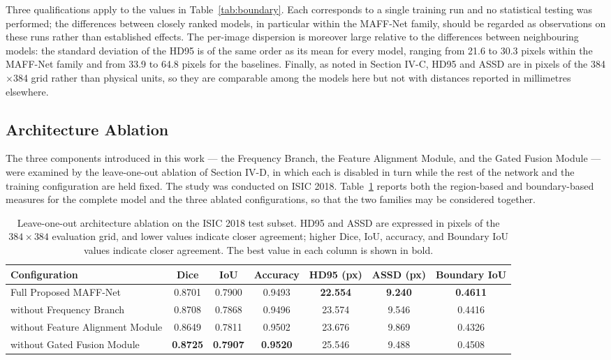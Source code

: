 Three qualifications apply to the values in Table~\ref{tab:boundary}. Each corresponds to a single training run and no statistical testing was performed; the differences between closely ranked models, in particular within the MAFF-Net family, should be regarded as observations on these runs rather than established effects. The per-image dispersion is moreover large relative to the differences between neighbouring models: the standard deviation of the HD95 is of the same order as its mean for every model, ranging from 21.6 to 30.3 pixels within the MAFF-Net family and from 33.9 to 64.8 pixels for the baselines. Finally, as noted in Section IV-C, HD95 and ASSD are in pixels of the 384$\times$384 grid rather than physical units, so they are comparable among the models here but not with distances reported in millimetres elsewhere.

\subsection{Architecture Ablation}

The three components introduced in this work --- the Frequency Branch, the Feature Alignment Module, and the Gated Fusion Module --- were examined by the leave-one-out ablation of Section IV-D, in which each is disabled in turn while the rest of the network and the training configuration are held fixed. The study was conducted on ISIC 2018. Table~\ref{tab:ablation} reports both the region-based and boundary-based measures for the complete model and the three ablated configurations, so that the two families may be considered together.

\begin{table}[!t]
\centering
\caption{Leave-one-out architecture ablation on the ISIC 2018 test subset. HD95
and ASSD are expressed in pixels of the $384\times384$ evaluation grid, and lower
values indicate closer agreement; higher Dice, IoU, accuracy, and Boundary IoU
values indicate closer agreement. The best value in each column is shown in
bold.}
\label{tab:ablation}
\setlength{\tabcolsep}{6pt}
\small
\begin{tabular}{lcccccc}
\toprule
Configuration & Dice & IoU & Accuracy & HD95 (px) & ASSD (px) & Boundary IoU \\
\midrule
Full Proposed MAFF-Net & 0.8701 & 0.7900 & 0.9493 & \textbf{22.554} & \textbf{9.240} & \textbf{0.4611} \\
without Frequency Branch & 0.8708 & 0.7868 & 0.9496 & 23.574 & 9.546 & 0.4416 \\
without Feature Alignment Module & 0.8649 & 0.7811 & 0.9502 & 23.676 & 9.869 & 0.4326 \\
without Gated Fusion Module & \textbf{0.8725} & \textbf{0.7907} & \textbf{0.9520} & 25.546 & 9.488 & 0.4508 \\
\bottomrule
\end{tabular}
\end{table}


